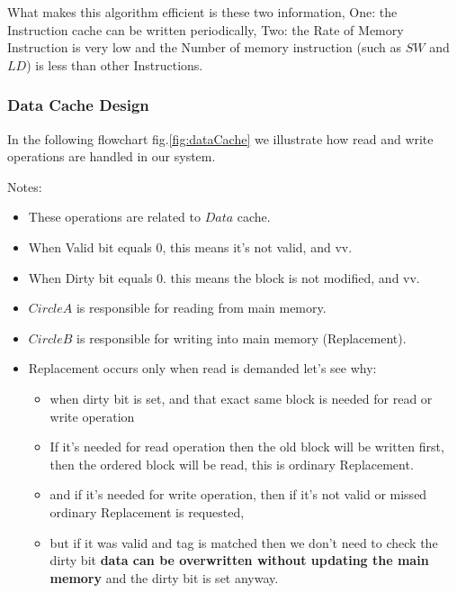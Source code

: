     \vspace{1cm}
    What makes this algorithm efficient is these two information, One: the Instruction cache
    can be written periodically, Two: the Rate of Memory Instruction is very low and the Number
    of memory instruction (such as $SW$ and $LD$) is less than other Instructions.
    
    \subsubsection{Data Cache Design}

    In the following flowchart fig.\ref{fig:dataCache} we illustrate how read and write operations are
    handled in our system.\newline

    Notes:
    \begin{itemize}
        \item These operations are related to $Data$ cache.
        \item When Valid bit equals 0, this means it's not valid, and vv.
        \item When Dirty bit equals 0. this means the block is not modified, and vv.
        \item $Circle A$ is responsible for reading from main memory.
        \item $Circle B$ is responsible for writing into main memory (Replacement).
        \item Replacement occurs only when read is demanded let's see why:
            \begin{itemize}
                \item when dirty bit is set, and that exact same block is needed for read or write operation
                \item If it's needed for read operation then the old block will be written first,
                    then the ordered block will be read, this is ordinary Replacement.
                \item and if it's needed for write operation, then if it's not valid or missed ordinary Replacement
                is requested,
                \item but if it was valid and tag is matched then we don't need to check the dirty bit
                \textbf{data can be overwritten without updating the main memory} and the dirty bit is set anyway.
            \end{itemize}
    \end{itemize}
    
